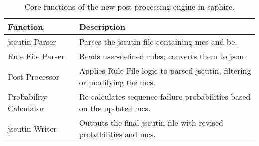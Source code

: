 \begin{table}[H]
\centering 
\caption{Core functions of the new post-processing engine in \acrshort{saphire}.}
\begin{tabular}{@{}ll@{}}
\toprule
\textbf{Function}                  & \textbf{Description}                                                                                             \\ 
\midrule
\acrshort{jscutin} Parser                & Parses the \acrshort{jscutin} file containing \acrshort{mcs} and \acrlong{be}.                                  \\
Rule File Parser                   & Reads user-defined rules; converts them to \acrshort{json}.                              \\
Post-Processor                     & Applies Rule File logic to parsed \acrshort{jscutin}, filtering or modifying the \acrshort{mcs}.                   \\
Probability Calculator             & Re-calculates sequence failure probabilities based on the updated \acrshort{mcs}.                                     \\
\acrshort{jscutin} Writer                     & Outputs the final \acrshort{jscutin} file with revised probabilities and \acrshort{mcs}.                                \\ 
\bottomrule
\end{tabular}
\label{tab:coreFunctions}
\end{table}